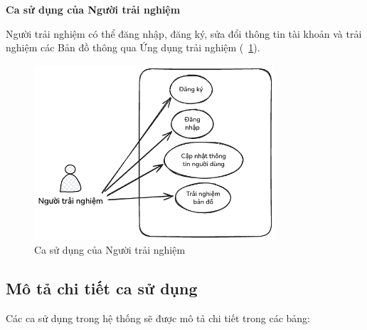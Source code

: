 \textbf{Ca sử dụng của Người trải nghiệm}

Người trải nghiệm có thể đăng nhập, đăng ký, sửa đổi thông tin tài khoản và
trải nghiệm các Bản đồ thông qua Ứng dụng trải nghiệm (\figurename~\ref{fig:user_use_case}).
\begin{figure}[h]
    \centering
    \includegraphics[width=0.8\textwidth]{figures/user-use-case.excalidraw.png}
    \caption{Ca sử dụng của Người trải nghiệm}
    \label{fig:user_use_case}
\end{figure}


\subsection*{Mô tả chi tiết ca sử dụng}
Các ca sử dụng trong hệ thống sẽ được mô tả chi tiết trong các bảng:

